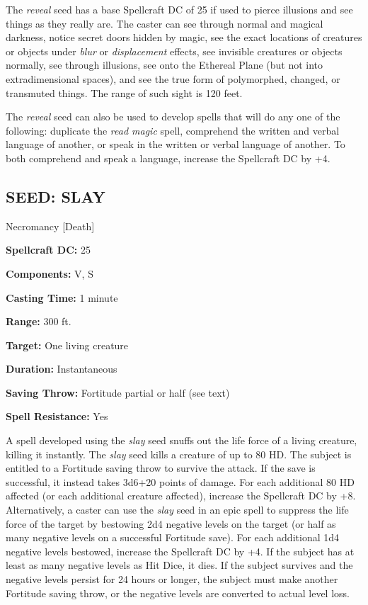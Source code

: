 \documentclass{article}
\begin{document}
The \textit{reveal }seed has a base Spellcraft DC of 25 if used to pierce illusions 
and see things as they really are. The caster can see through normal and magical 
darkness, notice secret doors hidden by magic, see the exact locations of creatures 
or objects under \textit{blur }or \textit{displacement }effects, see invisible 
creatures or objects normally, see through illusions, see onto the Ethereal Plane 
(but not into extradimensional spaces), and see the true form of polymorphed, changed, 
or transmuted things. The range of such sight is 120 feet. 

The \textit{reveal }seed can also be used to develop spells that will do any one 
of the following: duplicate the \textit{read magic }spell, comprehend the written 
and verbal language of another, or speak in the written or verbal language of another. 
To both comprehend and speak a language, increase the Spellcraft DC by +4. 

\vspace{12pt}
\subsection*{SEED: SLAY }

Necromancy [Death] 

\textbf{Spellcraft DC:} 25 

\textbf{Components:} V, S 

\textbf{Casting Time:} 1 minute 

\textbf{Range:} 300 ft.

\textbf{Target:} One living creature 

\textbf{Duration:} Instantaneous 

\textbf{Saving Throw:} Fortitude partial or half (see text) 

\textbf{Spell Resistance:} Yes 

A spell developed using the \textit{slay }seed snuffs out the life force of a living 
creature, killing it instantly. The \textit{slay }seed kills a creature of up to 
80 HD. The subject is entitled to a Fortitude saving throw to survive the attack. 
If the save is successful, it instead takes 3d6+20 points of damage. For each additional 
80 HD affected (or each additional creature affected), increase the Spellcraft 
DC by +8. Alternatively, a caster can use the \textit{slay }seed in an epic spell 
to suppress the life force of the target by bestowing 2d4 negative levels on the 
target (or half as many negative levels on a successful Fortitude save). For each 
additional 1d4 negative levels bestowed, increase the Spellcraft DC by +4. If the 
subject has at least as many negative levels as Hit Dice, it dies. If the subject 
survives and the negative levels persist for 24 hours or longer, the subject must 
make another Fortitude saving throw, or the negative levels are converted to actual 
level loss. 
\end{document}
